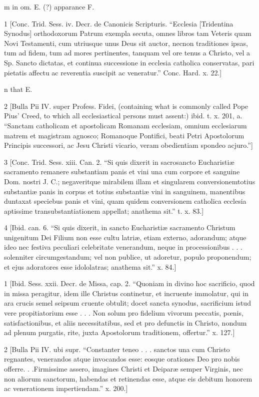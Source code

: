 m
in om. E. (?) apparance F.

1
[Conc. Trid. Sess. iv. Decr. de Canonicis Scripturis. “Ecclesia [Tridentina Synodus] orthodoxorum Patrum exempla secuta, omnes libros tam Veteris quam Novi Testamenti, cum utriusque unus Deus sit auctor, necnon traditiones ipsas, tum ad fidem, tum ad mores pertinentes, tanquam vel ore tenus a Christo, vel a Sp. Sancto dictatas, et continua successione in ecclesia catholica conservatas, pari pietatis affectu ac reverentia suscipit ac veneratur.” Conc. Hard. x. 22.]

n
that E.

2
[Bulla Pii IV. super Profess. Fidei, (containing what is commonly called Pope Pius’ Creed, to which all ecclesiastical persons must assent:) ibid. t. x. 201, a. “Sanctam catholicam et apostolicam Romanam ecclesiam, omnium ecclesiarum matrem et magistram agnosco; Romanoque Pontifici, beati Petri Apostolorum Principis successori, ac Jesu Christi vicario, veram obedientiam spondeo acjuro.”]

3
[Conc. Trid. Sess. xiii. Can. 2. “Si quis dixerit in sacrosancto Eucharistiæ sacramento remanere substantiam panis et vini una cum corpore et sanguine Dom. nostri J. C.; negaveritque mirabilem illam et singularem conversionemtotius substantiæ panis in corpus et totius substantiæ vini in sanguinem, manentibus duntaxat speciebus panis et vini, quam quidem conversionem catholica ecclesia aptissime transubstantiationem appellat; anathema sit.” t. x. 83.]

4
[Ibid. can. 6. “Si quis dixerit, in sancto Eucharistiæ sacramento Christum unigenitum Dei Filium non esse cultu latriæ, etiam externo, adorandum; atque ideo nec festiva peculiari celebritate venerandum, neque in processionibus . . . solenniter circumgestandum; vel non publice, ut adoretur, populo proponendum; et ejus adoratores esse idololatras; anathema sit.” x. 84.]

1
[Ibid. Sess. xxii. Decr. de Missa, cap. 2. “Quoniam in divino hoc sacrificio, quod in missa peragitur, idem ille Christus continetur, et incruente immolatur, qui in ara crucis semel seipsum cruente obtulit; docet sancta synodus, sacrificium istud vere propitiatorium esse . . . Non solum pro fidelium vivorum peccatis, pœnis, satisfactionibus, et aliis necessitatibus, sed et pro defunctis in Christo, nondum ad plenum purgatis, rite, juxta Apostolorum traditionem, offertur.” x. 127.]

2
[Bulla Pii IV. ubi supr. “Constanter teneo . . . sanctos una cum Christo regnantes, venerandos atque invocandos esse: eosque orationes Deo pro nobis offerre. . .Firmissime assero, imagines Christi et Deiparæ semper Virginis, nec non aliorum sanctorum, habendas et retinendas esse, atque eis debitum honorem ac venerationem impertiendam.” x. 200.]

